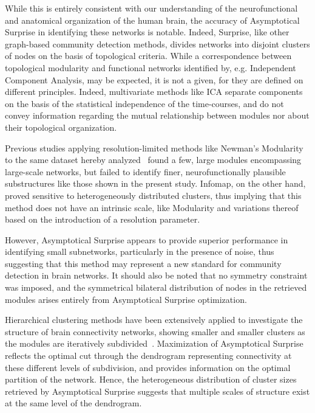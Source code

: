 While this is entirely consistent with our understanding of the neurofunctional and anatomical organization of the human brain, the accuracy of Asymptotical Surprise in identifying these networks is notable.
Indeed, Surprise, like other graph-based community detection methods, divides networks into disjoint clusters of nodes on the basis of topological criteria.
While a correspondence between topological modularity and functional networks identified by, e.g.
Independent Component Analysis, may be expected, it is not a given, for they are defined on different principles.
Indeed, multivariate methods like ICA separate components on the basis of the statistical independence of the time-courses, and do not convey information regarding the mutual relationship between modules nor about their topological organization.

Previous studies applying resolution-limited methods like Newman's Modularity to the same dataset hereby analyzed~\cite{crossley2013a} found a few, large modules encompassing large-scale networks, but failed to identify finer, neurofunctionally plausible substructures like those shown in the present study.
Infomap, on the other hand, proved sensitive to heterogeneously distributed clusters, thus implying that this method does not have an intrinsic scale, like Modularity and variations thereof based on the introduction of a resolution parameter.

However, Asymptotical Surprise appears to provide superior performance in identifying small subnetworks, particularly in the presence of noise, thus suggesting that this method may represent a new standard for community detection in brain networks.
It should also be noted that no symmetry constraint was imposed, and the symmetrical bilateral distribution of nodes in the retrieved modules arises entirely from Asymptotical Surprise optimization.


Hierarchical clustering methods have been extensively applied to investigate the structure of brain connectivity networks, showing smaller and smaller clusters as the modules are iteratively subdivided~\cite{meunier2010}.
Maximization of Asymptotical Surprise reflects the optimal cut through the dendrogram representing connectivity at these different levels of subdivision, and provides information on the optimal partition of the network.
Hence, the heterogeneous distribution of cluster sizes retrieved by Asymptotical Surprise suggests that multiple scales of structure exist at the same level of the dendrogram.

